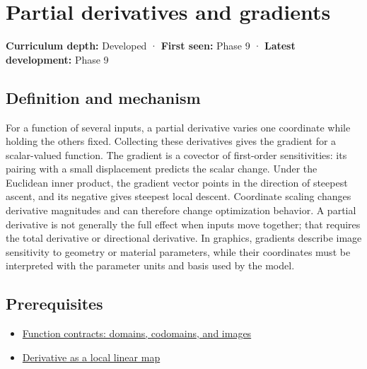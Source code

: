 \hypertarget{appendix-677b59746ae0}{}\label{referencestart:appendix-677b59746ae0}
\section{Partial derivatives and gradients}\label{appendix-677b59746ae0-partial-derivatives-and-gradients}

\hypertarget{appendix-677b59746ae0-partial-derivatives-and-gradients}{}

\textbf{Curriculum depth:} Developed · \textbf{First seen:} Phase 9 · \textbf{Latest development:} Phase 9

\begin{allmightroledefinition}

\subsection{Definition and mechanism}\label{appendix-677b59746ae0-definition-and-mechanism}

\hypertarget{appendix-677b59746ae0-definition-and-mechanism}{}

For a function of several inputs, a partial derivative varies one coordinate while holding the others fixed. Collecting these derivatives gives the gradient for a scalar-valued function. The gradient is a covector of first-order sensitivities: its pairing with a small displacement predicts the scalar change. Under the Euclidean inner product, the gradient vector points in the direction of steepest ascent, and its negative gives steepest local descent. Coordinate scaling changes derivative magnitudes and can therefore change optimization behavior. A partial derivative is not generally the full effect when inputs move together; that requires the total derivative or directional derivative. In graphics, gradients describe image sensitivity to geometry or material parameters, while their coordinates must be interpreted with the parameter units and basis used by the model.

\end{allmightroledefinition}

\subsection{Prerequisites}\label{appendix-677b59746ae0-prerequisites}

\hypertarget{appendix-677b59746ae0-prerequisites}{}

\begin{itemize}
\tightlist
\item
  \hyperref[appendix-a59658325cd6]{Function contracts: domains, codomains, and images}
\item
  \hyperref[appendix-7bc181935c42]{Derivative as a local linear map}
\end{itemize}

